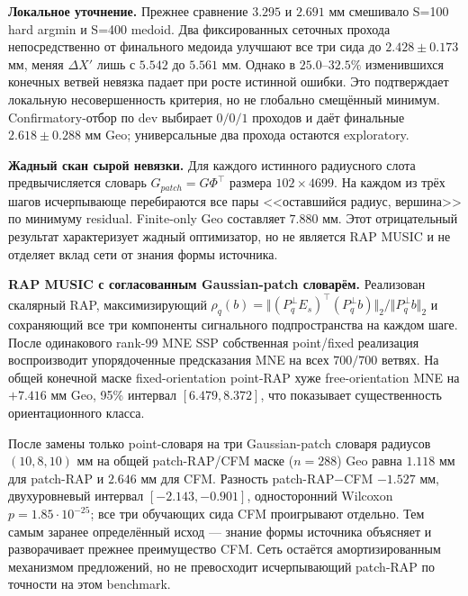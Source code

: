 \textbf{Локальное уточнение.} Прежнее сравнение $3.295$ и $2.691$ мм смешивало S=100 hard argmin и S=400 medoid. Два фиксированных сеточных прохода непосредственно от финального медоида улучшают все три сида до $2.428\pm0.173$ мм, меняя $\Delta X'$ лишь с $5.542$ до $5.561$ мм. Однако в $25.0$--$32.5\%$ изменившихся конечных ветвей невязка падает при росте истинной ошибки. Это подтверждает локальную несовершенность критерия, но не глобально смещённый минимум. Confirmatory-отбор по dev выбирает $0/0/1$ проходов и даёт финальные $2.618\pm0.288$ мм Geo; универсальные два прохода остаются exploratory.

\textbf{Жадный скан сырой невязки.} Для каждого истинного радиусного слота предвычисляется словарь $G_{patch}=G\Phi^{\top}$ размера $102\times4699$. На каждом из трёх шагов исчерпывающе перебираются все пары <<оставшийся радиус, вершина>> по минимуму residual. Finite-only Geo составляет $7.880$ мм. Этот отрицательный результат характеризует жадный оптимизатор, но не является RAP MUSIC и не отделяет вклад сети от знания формы источника.

\textbf{RAP MUSIC с согласованным Gaussian-patch словарём.} Реализован скалярный RAP, максимизирующий $\rho_q(b)=\Vert(P_q^\perp E_s)^\top(P_q^\perp b)\Vert_2/\Vert P_q^\perp b\Vert_2$ и сохраняющий все три компоненты сигнального подпространства на каждом шаге. После одинакового rank-99 MNE SSP собственная point/fixed реализация воспроизводит упорядоченные предсказания MNE на всех $700/700$ ветвях. На общей конечной маске fixed-orientation point-RAP хуже free-orientation MNE на $+7.416$ мм Geo, 95\% интервал $[6.479,8.372]$, что показывает существенность ориентационного класса.

После замены только point-словаря на три Gaussian-patch словаря радиусов $(10,8,10)$ мм на общей patch-RAP/CFM маске ($n=288$) Geo равна $1.118$ мм для patch-RAP и $2.646$ мм для CFM. Разность patch-RAP$-$CFM $-1.527$ мм, двухуровневый интервал $[-2.143,-0.901]$, односторонний Wilcoxon $p=1.85\cdot10^{-25}$; все три обучающих сида CFM проигрывают отдельно. Тем самым заранее определённый исход --- знание формы источника объясняет и разворачивает прежнее преимущество CFM. Сеть остаётся амортизированным механизмом предложений, но не превосходит исчерпывающий patch-RAP по точности на этом benchmark.

